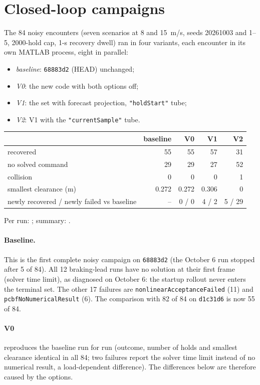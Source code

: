 \documentclass[11pt]{article}
\begin{document}
\section{Closed-loop campaigns}
The 84 noisy encounters (seven scenarios at 8 and 15~m/s, seeds 20261003 and
1--5, 2000-hold cap, 1-s recovery dwell) ran in four variants, each encounter
in its own MATLAB process, eight in parallel:
\begin{itemize}
\item \emph{baseline}: \texttt{68883d2} (HEAD) unchanged;
\item \emph{V0}: the new code with both options off;
\item \emph{V1}: the set with forecast projection, \texttt{"holdStart"} tube;
\item \emph{V2}: V1 with the \texttt{"currentSample"} tube.
\end{itemize}
\begin{center}
\begin{tabular}{lrrrr}
\toprule
 & baseline & V0 & V1 & V2\\
\midrule
recovered & 55 & 55 & 57 & 31\\
no solved command & 29 & 29 & 27 & 52\\
collision & 0 & 0 & 0 & 1\\
smallest clearance (m) & 0.272 & 0.272 & 0.306 & 0\\
newly recovered / newly failed vs baseline & -- & 0 / 0 & 4 / 2 & 5 / 29\\
\bottomrule
\end{tabular}
\end{center}
Per run: ; summary:
.

\paragraph{Baseline.} This is the first complete noisy campaign on
\texttt{68883d2} (the October 6 run stopped after 5 of 84). All 12 braking-lead
runs have no solution at their first frame (solver time limit), as diagnosed
on October 6: the startup rollout never enters the terminal set. The other 17
failures are \texttt{nonlinearAcceptanceFailed} (11) and
\texttt{pcbfNoNumericalResult} (6). The comparison with 82 of 84 on
\texttt{d1c31d6} is now 55 of 84.

\paragraph{V0} reproduces the baseline run for run (outcome, number of holds and
smallest clearance identical in all 84; two failures report the solver time
limit instead of no numerical result, a load-dependent difference). The
differences below are therefore caused by the options.
\end{document}

